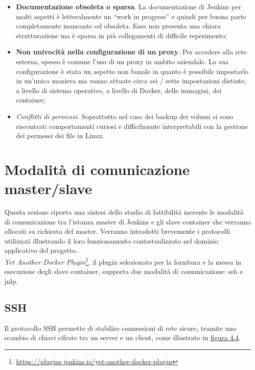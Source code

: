 \begin{itemize}
    \item \textbf{Documentazione obsoleta o sparsa}. La documentazione di Jenkins per molti aspetti è letteralmente un ``work in progress'' e quindi per buona parte completamente mancante od obsoleta. Essa non presenta una chiara strutturazione ma è sparsa in più collegamenti di difficile reperimento;
    \item \textbf{Non univocità nella configurazione di un proxy}. Per accedere alla rete esterna, spesso è comune l'uso di un proxy in ambito aziendale. La sua configurazione è stata un aspetto non banale in quanto è possibile impostarlo in un'unica maniera ma vanno attuate circa sei / sette impostazioni distinte, a livello di sistema operativo, a livello di Docker, delle immagini, dei container;
    \item \textit{Conflitti di permessi}. Soprattutto nel caso dei backup dei volumi si sono riscontrati comportamenti curiosi e difficilmente interpretabili con la gestione dei permessi dei file in \gls{Linux}. 
\end{itemize}

\section{Modalità di comunicazione master/slave}

Questa sezione riporta una sintesi dello studio di fattibilità inerente le modalità di comunicazione tra l'istanza \gls{master} di Jenkins e gli \gls{slave} \gls{container} che verranno allocati su richiesta del master. Verranno introdotti brevemente i protocolli utilizzati illustrando il loro funzionamento contestualizzato nel dominio applicativo del progetto. \\

\textit{Yet Another Docker Plugin}\footnote{\url{https://plugins.jenkins.io/yet-another-docker-plugin}}, il \gls{plugin} selezionato per la fornitura e la messa in esecuzione degli slave container, supporta due modalità di comunicazione: \gls{ssh} e \gls{jnlp}.  

\subsection{SSH}
\label{subsec:ssh}

Il protocollo SSH permette di stabilire connessioni di rete sicure, tramite uno scambio di chiavi cifrate tra un server e un client, come illustrato in \hyperref[fig:ssh-connection]{figura 4.4}.

